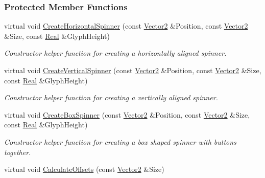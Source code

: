 \subsubsection*{Protected Member Functions}
\begin{DoxyCompactItemize}
\item 
\hypertarget{classphys_1_1UI_1_1Spinner_a74fd8b5185cae46beef77599fe6ef44f}{
virtual void \hyperlink{classphys_1_1UI_1_1Spinner_a74fd8b5185cae46beef77599fe6ef44f}{CreateHorizontalSpinner} (const \hyperlink{classphys_1_1Vector2}{Vector2} \&Position, const \hyperlink{classphys_1_1Vector2}{Vector2} \&Size, const \hyperlink{namespacephys_af7eb897198d265b8e868f45240230d5f}{Real} \&GlyphHeight)}
\label{classphys_1_1UI_1_1Spinner_a74fd8b5185cae46beef77599fe6ef44f}

\begin{DoxyCompactList}\small\item\em Constructor helper function for creating a horizontally aligned spinner. \item\end{DoxyCompactList}\item 
\hypertarget{classphys_1_1UI_1_1Spinner_aea2fe91287c9757abb6758a9b0c129cb}{
virtual void \hyperlink{classphys_1_1UI_1_1Spinner_aea2fe91287c9757abb6758a9b0c129cb}{CreateVerticalSpinner} (const \hyperlink{classphys_1_1Vector2}{Vector2} \&Position, const \hyperlink{classphys_1_1Vector2}{Vector2} \&Size, const \hyperlink{namespacephys_af7eb897198d265b8e868f45240230d5f}{Real} \&GlyphHeight)}
\label{classphys_1_1UI_1_1Spinner_aea2fe91287c9757abb6758a9b0c129cb}

\begin{DoxyCompactList}\small\item\em Constructor helper function for creating a vertically aligned spinner. \item\end{DoxyCompactList}\item 
\hypertarget{classphys_1_1UI_1_1Spinner_aeca447d00d7165acb9f6f4cd253607e5}{
virtual void \hyperlink{classphys_1_1UI_1_1Spinner_aeca447d00d7165acb9f6f4cd253607e5}{CreateBoxSpinner} (const \hyperlink{classphys_1_1Vector2}{Vector2} \&Position, const \hyperlink{classphys_1_1Vector2}{Vector2} \&Size, const \hyperlink{namespacephys_af7eb897198d265b8e868f45240230d5f}{Real} \&GlyphHeight)}
\label{classphys_1_1UI_1_1Spinner_aeca447d00d7165acb9f6f4cd253607e5}

\begin{DoxyCompactList}\small\item\em Constructor helper function for creating a box shaped spinner with buttons together. \item\end{DoxyCompactList}\item 
\hypertarget{classphys_1_1UI_1_1Spinner_abbbdba70d318c15564e120136d472ae9}{
virtual void \hyperlink{classphys_1_1UI_1_1Spinner_abbbdba70d318c15564e120136d472ae9}{CalculateOffsets} (const \hyperlink{classphys_1_1Vector2}{Vector2} \&Size)}
\label{classphys_1_1UI_1_1Spinner_abbbdba70d318c15564e120136d472ae9}


\end{DoxyCompactItemize}
